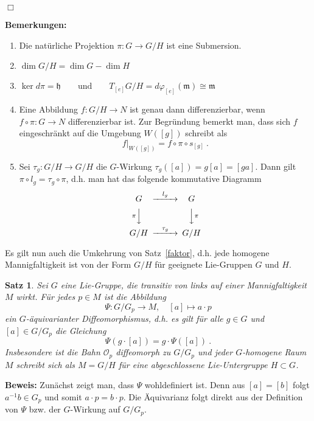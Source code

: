 \documentclass[12pt,a4paper]{article}
\def\m{\mathfrak{m}}
\def\h{\mathfrak{h}}
\newtheorem{Satz}[Lemma]{Satz}
\def\proof{\noindent\textbf{Beweis:}\quad}
\def\qed{\quad\hfill\ensuremath{\Box}}
\begin{document}
\qed

\bigskip

{\bf Bemerkungen:}
\begin{enumerate}
\item
Die nat\"urliche Projektion $\pi : G \rightarrow G/H$ ist eine Submersion.
\item
$\dim G/H = \dim G - \dim H$
\item
$\ker d\pi = \h \qquad \mbox{und} \qquad T_{[e]}G/H = d\varphi_{[e]}(\m)\cong \m$
\item
Eine Abbildung $f:G/H\rightarrow N$ ist genau dann differenzierbar, wenn $f\circ \pi : G \rightarrow N$
differenzierbar ist. Zur Begr\"undung bemerkt man, dass sich $f$ eingeschr\"ankt auf die Umgebung $W([g])$
schreibt als
$$
\left. f \right|_{W([g])} = f \circ \pi \circ s_{[g]} \ .
$$
\item
Sei $\tau_g: G/H \rightarrow G/H$ die $G$-Wirkung $\tau_g([a])= g[a]= [ga]$. Dann gilt
$\pi \circ l_g = \tau_g \circ \pi$, d.h. man hat das folgende kommutative Diagramm
\begin{equation*}
\begin{CD}
G @> l_g >> G \\
@V \pi  VV @VV \pi V \\
G/H @> \tau_g >> G/H
\end{CD}
\end{equation*}
\end{enumerate}

\bigskip

Es gilt nun auch die Umkehrung von Satz~\ref{faktor}, d.h. jede homogene Mannigfaltigkeit
ist von der Form $G/H$ f\"ur geeignete Lie-Gruppen $G$ und $H$.

\bigskip

\begin{Satz}
Sei $G$ eine Lie-Gruppe, die transitiv von links auf einer Mannigfaltigkeit $M$ wirkt. F\"ur jedes
$p\in M$ ist die Abbildung
$$
\Psi : G/G_p \rightarrow M, \quad [a] \mapsto a \cdot p
$$
ein $G$-\"aquivarianter Diffeomorphismus, d.h. es gilt f\"ur alle $g\in G$ und $[a]\in G/G_p$
die Gleichung
$$
\Psi(g \cdot [a]) = g \cdot \Psi([a]) \ .
$$
Insbesondere ist die Bahn $\mathcal O_p$ diffeomorph zu $G/G_p$ und jeder $G$-homogene Raum $M$
schreibt sich als $M=G/H$ f\"ur eine abgeschlossene Lie-Untergruppe $H \subset G$.
\end{Satz}
\proof
Zun\"achst zeigt man, dass $\Psi$ wohldefiniert ist. Denn aus $[a] = [b]$ folgt $a^{-1} b \in G_p$
und somit $a\cdot p = b \cdot p $. Die \"Aquivarianz folgt direkt aus der Definition von $\Psi$
bzw. der $G$-Wirkung auf $G/G_p$.
\end{document}
